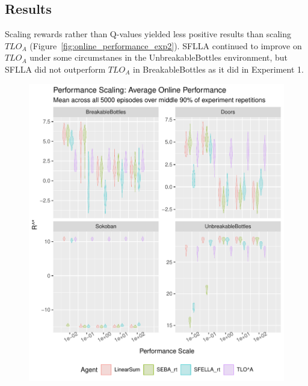 \subsection{Results}

Scaling rewards rather than Q-values yielded less positive results than scaling $TLO_A$ (Figure~\ref{fig:online_performance_exp2}). SFLLA continued to improve on $TLO_A$ under some circumstanes in the UnbreakableBottles environment, but SFLLA did not outperform $TLO_A$ in BreakableBottles as it did in Experiment 1. 

\begin{figure}
  \includegraphics[width=\columnwidth]{output/multirun_n100_reward_to_util_transformonline_util_transform_Performance.pdf}

\end{figure}
